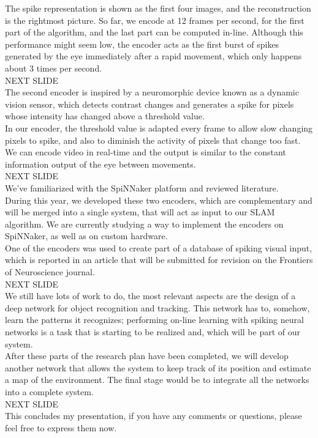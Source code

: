 \documentclass[12t,a4paper]{memoir}
\begin{document}
The spike representation is shown as the first four images, and the reconstruction is the rightmost picture. So far, we encode at 12 frames per second, for the first part of the algorithm, and the last part can be computed in-line. Although this performance might seem low, the encoder acts as the first burst of spikes generated by the eye immediately after a rapid movement, which only happens about 3 times per second.\\

{\Large NEXT SLIDE}\\

The second encoder is inspired by a neuromorphic device known as a dynamic vision sensor, which detects contrast changes and generates a spike for pixels whose intensity has changed above a threshold value.\\

In our encoder, the threshold value is adapted every frame to allow slow changing pixels to spike, and also to diminish the activity of pixels that change too fast. We can encode video in real-time and the output is similar to the constant information output of the eye between movements.\\

{\Large NEXT SLIDE}\\

We've familiarized with the SpiNNaker platform and reviewed literature. \\

During this year, we developed these two encoders, which are complementary and will be merged into a single system, that will act as input to our SLAM algorithm. We are currently studying a way to implement the encoders on SpiNNaker, as well as on custom hardware.\\

One of the encoders was used to create part of a database of spiking visual input, which is reported in an article that will be submitted for revision on the Frontiers of Neuroscience journal.\\


{\Large NEXT SLIDE}\\

We still have lots of work to do, the most relevant aspects are the design of a deep network for object recognition and tracking. This network has to, somehow, learn the patterns it recognizes; performing on-line learning with spiking neural networks is a task that is starting to be realized and, which will be part of our system. \\

After these parts of the research plan have been completed, we will develop another network  that allows the system to keep track of its position and estimate a map of the environment. The final stage would be to integrate all the networks into a complete system.\\

{\Large NEXT SLIDE}\\

This concludes my presentation, if you have any comments or questions, please feel free to express them now.\\
\end{document}
